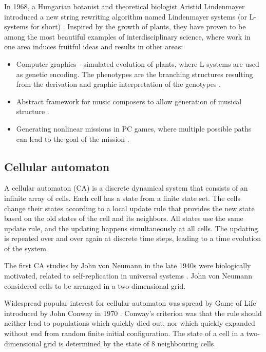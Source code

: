 In 1968, a Hungarian botanist and theoretical biologist Aristid Lindenmayer introduced a new string rewriting algorithm named Lindenmayer systems (or  L-systems for short) \cite{Lindenmayer68, Rozenberg12Lindenmayer}. Inspired by the growth of plants, they have proven to be among the most beautiful examples of interdisciplinary science, where work in one area induces fruitful ideas and results in other areas:
\begin{itemize}
  \item Computer graphics - simulated evolution of plants, where L-systems are used as genetic encoding. The phenotypes are the branching structures resulting from the derivation and graphic interpretation of the genotypes \cite{Ochoa98GeneticLSystems}.
  \item Abstract framework for music composers to allow generation of musical structure \cite{Manousakis06MusicalLSystems}.
  \item Generating nonlinear missions in PC games, where multiple possible paths can lead to the goal of the mission \cite{Togelius2016LSystemsLevels}.
\end{itemize}


\subsection{Cellular automaton} %
\label{sub:cellular_automaton}

A cellular automaton (CA) is a discrete dynamical system that consists of an infinite array of cells. Each cell has a state from a finite state set. The cells change their states according to a local update rule that provides the new state based on the old states of the cell and its neighbors. All states use the same update rule, and the updating happens simultaneously at all cells. The updating is repeated over and over again at discrete time steps, leading to a time evolution of the system.

The first CA studies by John von Neumann in the late 1940s were biologically motivated, related to self-replication in universal systems \cite{Neumann66Cellular}. John von Neumann considered cells to be arranged in a two-dimensional grid.

Widespread popular interest for cellular automaton was spread by Game of Life introduced by John Conway in 1970 \cite{Gardner70Life}. Conway’s criterion was that the rule should neither lead to populations which quickly died out, nor which quickly expanded without end from random finite initial configuration. The state of a cell in a two-dimensional grid is determined by the state of 8 neighbouring cells.

